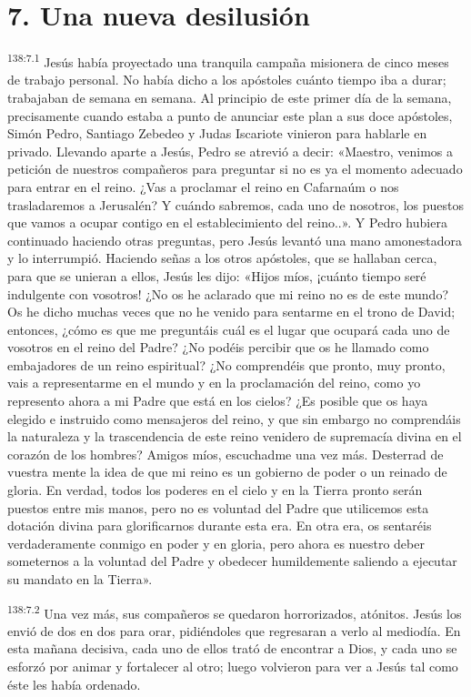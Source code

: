 \section*{7. Una nueva desilusión}
\par 
\textsuperscript{138:7.1} Jesús había proyectado una tranquila campaña misionera de cinco meses de trabajo personal. No había dicho a los apóstoles cuánto tiempo iba a durar; trabajaban de semana en semana. Al principio de este primer día de la semana, precisamente cuando estaba a punto de anunciar este plan a sus doce apóstoles, Simón Pedro, Santiago Zebedeo y Judas Iscariote vinieron para hablarle en privado. Llevando aparte a Jesús, Pedro se atrevió a decir: «Maestro, venimos a petición de nuestros compañeros para preguntar si no es ya el momento adecuado para entrar en el reino. ¿Vas a proclamar el reino en Cafarnaúm o nos trasladaremos a Jerusalén? Y cuándo sabremos, cada uno de nosotros, los puestos que vamos a ocupar contigo en el establecimiento del reino..». Y Pedro hubiera continuado haciendo otras preguntas, pero Jesús levantó una mano amonestadora y lo interrumpió. Haciendo señas a los otros apóstoles, que se hallaban cerca, para que se unieran a ellos, Jesús les dijo: «Hijos míos, ¡cuánto tiempo seré indulgente con vosotros! ¿No os he aclarado que mi reino no es de este mundo? Os he dicho muchas veces que no he venido para sentarme en el trono de David; entonces, ¿cómo es que me preguntáis cuál es el lugar que ocupará cada uno de vosotros en el reino del Padre? ¿No podéis percibir que os he llamado como embajadores de un reino espiritual? ¿No comprendéis que pronto, muy pronto, vais a representarme en el mundo y en la proclamación del reino, como yo represento ahora a mi Padre que está en los cielos? ¿Es posible que os haya elegido e instruido como mensajeros del reino, y que sin embargo no comprendáis la naturaleza y la trascendencia de este reino venidero de supremacía divina en el corazón de los hombres? Amigos míos, escuchadme una vez más. Desterrad de vuestra mente la idea de que mi reino es un gobierno de poder o un reinado de gloria. En verdad, todos los poderes en el cielo y en la Tierra pronto serán puestos entre mis manos, pero no es voluntad del Padre que utilicemos esta dotación divina para glorificarnos durante esta era. En otra era, os sentaréis verdaderamente conmigo en poder y en gloria, pero ahora es nuestro deber someternos a la voluntad del Padre y obedecer humildemente saliendo a ejecutar su mandato en la Tierra».

\par 
\textsuperscript{138:7.2} Una vez más, sus compañeros se quedaron horrorizados, atónitos. Jesús los envió de dos en dos para orar, pidiéndoles que regresaran a verlo al mediodía. En esta mañana decisiva, cada uno de ellos trató de encontrar a Dios, y cada uno se esforzó por animar y fortalecer al otro; luego volvieron para ver a Jesús tal como éste les había ordenado.

